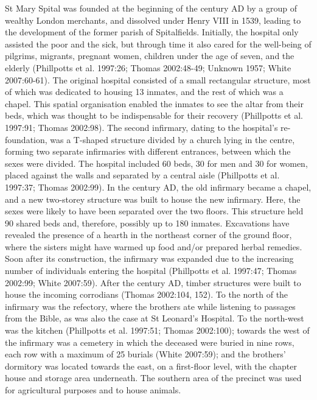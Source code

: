 \documentclass[%
	]{ijsra}
\begin{document}
St Mary Spital was founded at the beginning of the  century AD by a group of wealthy London merchants, and dissolved under Henry VIII in 1539, leading to the development of the former parish of Spitalfields. Initially, the hospital only assisted the poor and the sick, but through time it also cared for the well-being of pilgrims, migrants, pregnant women, children under the age of seven, and the elderly (Phillpotts et al. 1997:26; Thomas 2002:48-49; Unknown 1957; White 2007:60-61). 
The original hospital consisted of a small rectangular structure, most of which was dedicated to housing 13 inmates, and the rest of which was a chapel. This spatial organisation enabled the inmates to see the altar from their beds, which was thought to be indispensable for their recovery (Phillpotts et al. 1997:91; Thomas 2002:98).
The second infirmary, dating to the hospital’s re-foundation, was a T-shaped structure divided by a church lying in the centre, forming two separate infirmaries with different entrances, between which the sexes were divided. The hospital included 60 beds, 30 for men and 30 for women, placed against the walls and separated by a central aisle (Phillpotts et al. 1997:37; Thomas 2002:99). 
In the  century AD, the old infirmary became a chapel, and a new two-storey structure was built to house the new infirmary. Here, the sexes were likely to have been separated over the two floors. This structure held 90 shared beds and, therefore, possibly up to 180 inmates.
Excavations have revealed the presence of a hearth in the northeast corner of the ground floor, where the sisters might have warmed up food and/or prepared herbal remedies. Soon after its construction, the infirmary was expanded due to the increasing number of individuals entering the hospital (Phillpotts et al. 1997:47; Thomas 2002:99; White 2007:59). After the  century AD, timber structures were built to house the incoming corrodians (Thomas 2002:104, 152).
To the north of the infirmary was the refectory, where the brothers ate while listening to passages from the Bible, as was also the case at St Leonard’s Hospital. To the north-west was the kitchen (Phillpotts et al. 1997:51; Thomas 2002:100); towards the west of the infirmary was a cemetery in which the deceased were buried in nine rows, each row with a maximum of 25 burials (White 2007:59); and the brothers’ dormitory was located towards the east, on a first-floor level, with the chapter house and storage area underneath. The southern area of the precinct was used for agricultural purposes and to house animals.
\end{document}
